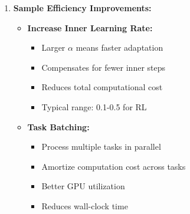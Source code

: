 \documentclass[12pt]{article}
\begin{document}
{{\begin{enumerate}
				\begin{itemize}
					\item \textbf{Use PPO Instead of Vanilla Policy Gradient:}
					\begin{equation}
					\mathcal{L}^{PPO}(\theta) = \mathbb{E}_t \left[ \min(r_t(\theta) A_t, \text{clip}(r_t(\theta), 1-\epsilon, 1+\epsilon) A_t) \right]
					\end{equation}
					where $r_t(\theta) = \frac{\pi_\theta(a_t|s_t)}{\pi_{\theta_{old}}(a_t|s_t)}$ is the importance ratio.
					
					\item \textbf{Baseline Subtraction:}
					\begin{equation}
					A_t = R_t - V(s_t)
					\end{equation}
					where $V(s_t)$ is a learned value function baseline.
					
					\item \textbf{Gradient Clipping:}
					\begin{equation}
					\nabla_\theta \mathcal{L} \leftarrow \text{clip}(\nabla_\theta \mathcal{L}, -\text{max\_norm}, \text{max\_norm})
					\end{equation}
				\end{itemize}
				
				\item \textbf{Sample Efficiency Improvements:}
				
				\begin{itemize}
					\item \textbf{Increase Inner Learning Rate:}
					\begin{itemize}
						\item Larger $\alpha$ means faster adaptation
						\item Compensates for fewer inner steps
						\item Reduces total computational cost
						\item Typical range: 0.1-0.5 for RL
					\end{itemize}
					
					\item \textbf{Task Batching:}
					\begin{itemize}
						\item Process multiple tasks in parallel
						\item Amortize computation cost across tasks
						\item Better GPU utilization
						\item Reduces wall-clock time
					\end{itemize}
					

\end{itemize}
\end{enumerate}}}
\end{document}
